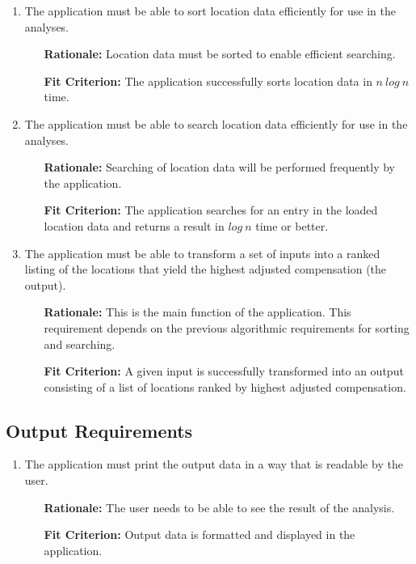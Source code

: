 \documentclass[english]{article}
\begin{document}
\begin{enumerate}[\bf{FAR}1.]
    \item The application must be able to sort location data efficiently for use in the analyses.
	\begin{enumerate}[leftmargin=1cm]
        \item [{\bf Rationale:}] Location data must be sorted to enable efficient searching.
        \item [{\bf Fit Criterion:}] The application successfully sorts location data in $n~log~n$ time.
	\end{enumerate}

	\item The application must be able to search location data efficiently for use in the analyses.
	\begin{enumerate}[leftmargin=1cm]
        \item [{\bf Rationale:}] Searching of location data will be performed frequently by the application.
        \item [{\bf Fit Criterion:}] The application searches for an entry in the loaded location data and returns a result in $log~n$ time or better.
	\end{enumerate}

    \item The application must be able to transform a set of inputs into a ranked listing of the locations that yield the highest adjusted compensation (the output).
	\begin{enumerate}[leftmargin=1cm]
        \item [{\bf Rationale:}] This is the main function of the application.  This requirement depends on the previous algorithmic requirements for sorting and searching.
        \item [{\bf Fit Criterion:}] A given input is successfully transformed into an output consisting of a list of locations ranked by highest adjusted compensation.
	\end{enumerate}

	

\end{enumerate}

\subsection{Output Requirements}
\begin{enumerate}[\bf{FOR}1.]
    \item The application must print the output data in a way that is readable by the user.
	\begin{enumerate}[leftmargin=1cm]
        \item [{\bf Rationale:}] The user needs to be able to see the result of the analysis.
        \item [{\bf Fit Criterion:}] Output data is formatted and displayed in the application.
	\end{enumerate}
	

\end{enumerate}
\end{document}
